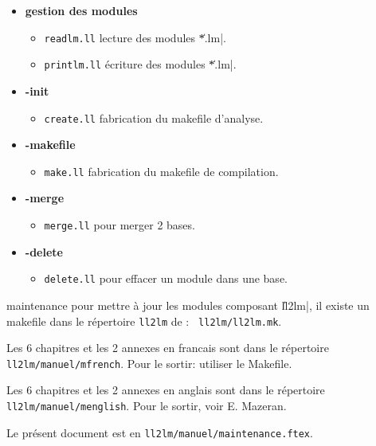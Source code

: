 \begin{itemize}
\item{\bf gestion des modules}
\begin{itemize}
\item{\tt readlm.ll}
lecture des modules \|*.lm|.
\item{\tt printlm.ll}
\'{e}criture des modules \|*.lm|.
\end{itemize}

\item{\bf -init}
\begin{itemize}
\item{\tt create.ll}
fabrication du makefile d'analyse.
\end{itemize}

\item{\bf -makefile}
\begin{itemize}
\item{\tt make.ll}
fabrication du makefile de compilation.
\end{itemize}

\item{\bf -merge}
\begin{itemize}
\item{\tt merge.ll}
pour merger 2 bases.
\end{itemize}

\item{\bf -delete}
\begin{itemize}
\item{\tt delete.ll}
pour effacer un module dans une base.
\end{itemize}

\end{itemize}


 {maintenance}
pour mettre \`{a} jour les modules composant \|ll2lm|, il existe un
makefile dans le r\'{e}pertoire {\tt ll2lm} de \LeLisp : {\tt
ll2lm/ll2lm.mk}.

Les 6 chapitres et les 2 annexes en francais sont dans le r\'{e}pertoire
{\tt ll2lm/manuel/mfrench}. Pour le sortir: utiliser le Makefile.

Les 6 chapitres et les 2 annexes en anglais sont dans le r\'{e}pertoire
{\tt ll2lm/manuel/menglish}. Pour le sortir, voir E. Mazeran.

Le pr\'{e}sent document est en {\tt ll2lm/manuel/maintenance.ftex}.


